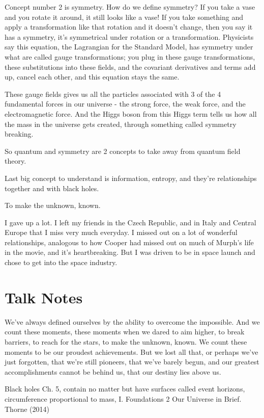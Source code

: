 \documentclass[10pt]{amsart}
\begin{document}
Concept number 2 is symmetry. How do we define symmetry? If you take a vase and you rotate it around, it still looks like a vase! If you take something and apply a transformation like that rotation and it doesn't change, then you say it has a symmetry, it's symmetrical under rotation or a transformation. Physicists say this equation, the Lagrangian for the Standard Model, has symmetry under what are called gauge transformations; you plug in these gauge transformations, these substitutions into these fields, and the covariant derivatives and terms add up, cancel each other, and this equation stays the same.

These gauge fields gives us all the particles associated with 3 of the 4 fundamental forces in our universe - the strong force, the weak force, and the electromagnetic force. And the Higgs boson from this Higgs term tells us how all the mass in the universe gets created, through something called symmetry breaking.

So quantum and symmetry are 2 concepts to take away from quantum field theory.

Last big concept to understand is information, entropy, and they're relationships together and with black holes.



To make the unknown, known.

I gave up a lot. I left my friends in the Czech Republic, and in Italy and Central Europe that I miss very much everyday. I missed out on a lot of wonderful relationships, analogous to how Cooper had missed out on much of Murph's life in the movie, and it's heartbreaking. But I was driven to be in space launch and chose to get into the space industry.


\section{Talk Notes}

We've always defined ourselves by the ability to overcome the impossible. And we count these moments, these moments when we dared to aim higher, to break barriers, to reach for the stars, to make the unknown, known. We count these moments to be our proudest achievements. But we lost all that, or perhaps we've just forgotten, that we're still pioneers, that we've barely begun, and our greatest accomplishments cannot be behind us, that our destiny lies above us. 


Black holes Ch. 5, contain no matter but have surfaces called event horizons, circumference proportional to mass, I. Foundations 2 Our Universe in Brief. Thorne (2014) \cite{Thor2014}
\end{document}
